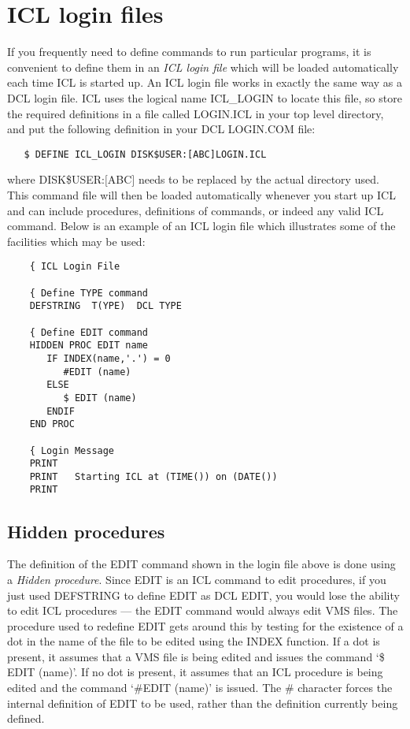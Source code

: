 \section{ICL login files}
\label{S_icllf}

If you frequently need to define commands to run particular programs, it is
convenient to define them in an {\em ICL login file} which will be loaded
automatically each time ICL is started up.
An ICL login file works in exactly the same way as a DCL login file.
ICL uses the logical name ICL\_LOGIN to locate this file, so store the
required definitions in a file called LOGIN.ICL in your top level directory,
and put the following definition in your DCL LOGIN.COM file:

\begin{small}
\begin{verbatim}
   $ DEFINE ICL_LOGIN DISK$USER:[ABC]LOGIN.ICL
\end{verbatim}
\end{small}

where DISK\$USER:$[$ABC$]$ needs to be replaced by the actual directory used.
This command file will then be loaded automatically whenever you start up ICL
and can include procedures, definitions of commands, or indeed any valid ICL
command.
Below is an example of an ICL login file which illustrates some of the
facilities which may be used:

\begin{small}
\begin{verbatim}
    { ICL Login File

    { Define TYPE command
    DEFSTRING  T(YPE)  DCL TYPE

    { Define EDIT command
    HIDDEN PROC EDIT name
       IF INDEX(name,'.') = 0
          #EDIT (name)
       ELSE
          $ EDIT (name)
       ENDIF
    END PROC

    { Login Message
    PRINT 
    PRINT   Starting ICL at (TIME()) on (DATE())
    PRINT
\end{verbatim}
\end{small}


\subsection{Hidden procedures}

The definition of the EDIT command shown in the login file above is done using
a {\em Hidden procedure}.
Since EDIT is an ICL command to edit procedures, if you just used DEFSTRING to
define EDIT as DCL EDIT, you would lose the ability to edit ICL procedures ---
the EDIT command would always edit VMS files.
The procedure used to redefine EDIT gets around this by testing for the
existence of a dot in the name of the file to be edited using the INDEX
function.
If a dot is present, it assumes that a VMS file is being edited and issues the
command `\$ EDIT (name)'.
If no dot is present, it assumes that an ICL procedure is being edited and
the command `\#EDIT (name)' is issued.
The \# character forces the internal definition of EDIT to be used, rather than
the definition currently being defined.

